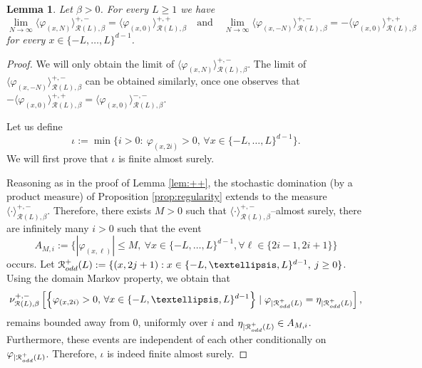 \documentclass[11pt,a4paper]{article}
\newtheorem{lemma}[theorem]{Lemma}
\theoremstyle{definition}
\numberwithin{equation}{section}
\newcommand\cR{\mathcal{R}}
\begin{document}
\begin{lemma}\label{lem: pm convergence}
Let $\beta>0$. For every $L\geq 1$ we have 
\begin{equation}
\lim_{N\to\infty}\langle \varphi_{(x,N)} \rangle^{+,-}_{\cR(L),\beta}=\langle \varphi_{(x,0)} \rangle^{+,+}_{\cR(L),\beta} \quad \text{and} \quad  \lim_{N\to\infty}\langle \varphi_{(x,-N)} \rangle^{+,-}_{\cR(L),\beta} =-\langle \varphi_{(x,0)} \rangle^{+,+}_{\cR(L),\beta} 
\end{equation}
for every $x\in \{-L,\ldots,L\}^{d-1}$.
\end{lemma}


\begin{proof}
We will only obtain the limit of $\langle \varphi_{(x,N)} \rangle^{+,-}_{\cR(L),\beta}$. The limit of $\langle \varphi_{(x,-N)} \rangle^{+,-}_{\cR(L),\beta}$ can be obtained similarly, once one observes that $-\langle \varphi_{(x,0)} \rangle^{+,+}_{\cR(L),\beta}=\langle \varphi_{(x,0)} \rangle^{-,-}_{\cR(L),\beta}$.

Let us define 
\begin{equation}
\iota := \min \{i>0:~ \varphi_{(x,2i)} >0, \, \forall x \in \{-L,\ldots, L \}^{d-1}\}.
\end{equation}
We will first prove that $\iota$ is finite almost surely.

Reasoning as in the proof of Lemma \ref{lem:++}, the stochastic domination (by a product measure) of Proposition \ref{prop:regularity} extends to the measure $\langle \cdot \rangle^{+,-}_{\mathcal R(L), \beta}$. Therefore, there exists $M>0$ such that $\langle \cdot\rangle^{+,-}_{\cR(L),\beta}$--almost surely, there are infinitely many $i>0$ such that the event  
\begin{equation}
A_{M,i}:=\{|\varphi_{(x,\ell)}|\leq M ,\: \forall x\in \{-L,\ldots,L\}^{d-1}, \forall \ell \in \{2i-1,2i+1\} \}
\end{equation}
occurs. Let $\mathcal{R}^+_{\rm odd}(L):=\{(x,2j+1): x\in \{-L,\ldots,L\}^{d-1}, \: j\geq 0\}$.  Using the domain Markov property, we obtain that
\begin{equation}
\nu^{+,-}_{\mathcal{R}(L),\beta}\left[\Big\{\varphi_{(x,2i)}>0,\, \forall x\in \{-L,\ldots,L\}^{d-1}\Big\} \mid \varphi_{|\mathcal{R}^+_{\rm odd}(L)}=\eta_{|\mathcal{R}^+_{\rm odd}(L)} \right],
\end{equation}
remains bounded away from $0$, uniformly over $i$ and $\eta_{|\mathcal{R}^+_{\rm odd}(L)}\in A_{M,i}$. Furthermore, these events are independent of each other conditionally on $\varphi_{|\mathcal{R}^+_{\rm odd}(L)}$. Therefore, $\iota$ is indeed finite almost surely.


\end{proof}
\end{document}
